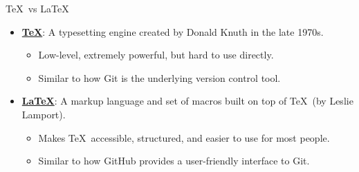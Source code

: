 \documentclass[x11names]{beamer} %
\begin{document}
\begin{frame}{\TeX\ vs \LaTeX{}}
    \begin{itemize}
        \item \textbf{\href{https://tug.org/}{\TeX}}: A typesetting engine created by Donald Knuth in the late 1970s.
        \begin{itemize}
            \item Low-level, extremely powerful, but hard to use directly.
            \item Similar to how Git is the underlying version control tool.
        \end{itemize}
        
        \item \textbf{\href{https://www.latex-project.org/}{\LaTeX}}: A markup language and set of macros built on top of \TeX\ (by Leslie Lamport).
        \begin{itemize}
            \item Makes \TeX\ accessible, structured, and easier to use for most people.
            \item Similar to how GitHub provides a user-friendly interface to Git.
        \end{itemize}
    \end{itemize}
    \end{frame}
\end{document}
